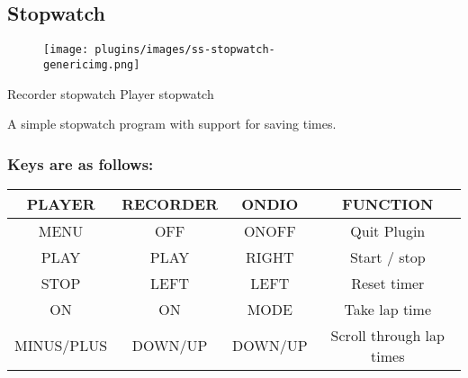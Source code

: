 \subsection{Stopwatch}
\begin{figure}[h!]
\begin{center}
\texttt{[image: plugins/images/ss-stopwatch-\\genericimg.png]}
\end{center}
\end{figure}
Recorder stopwatch  Player stopwatch  

A simple stopwatch program with support for saving times.

\subsubsection{Keys are as follows:}

\begin{table}[h!]
\begin{tabular}{|c|c|c|c|}
\hline
PLAYER & RECORDER & ONDIO & FUNCTION \\\hline
MENU & OFF & ONOFF & Quit Plugin \\\hline
PLAY & PLAY & RIGHT & Start / stop \\\hline
STOP & LEFT & LEFT & Reset timer \\\hline
ON & ON & MODE & Take lap time \\\hline
MINUS/PLUS & DOWN/UP & DOWN/UP & Scroll through lap times \\\hline
\end{tabular}
\end{table}
